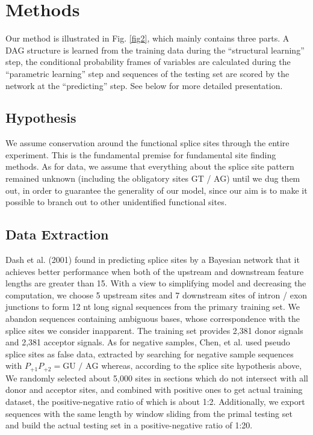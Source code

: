 \documentclass[journal,twoside]{IEEEtran}
\begin{document}
\section{Methods}\label{2}

Our method is illustrated in Fig. \ref{fig2}, which mainly contains three parts. A DAG structure is learned from the training data during the ``structural learning'' step, the conditional probability frames of variables are calculated during the ``parametric learning'' step and sequences of the testing set are scored by the network at the ``predicting'' step. See below for more detailed presentation. 

\subsection{Hypothesis}\label{2.1}

We assume conservation around the functional splice sites through the entire experiment. This is the fundamental premise for fundamental site finding methods. As for data, we assume that everything about the splice site pattern remained unknown (including the obligatory sites GT / AG) until we dug them out, in order to guarantee the generality of our model, since our aim is to make it possible to branch out to other unidentified functional sites. 

\subsection{Data Extraction}\label{2.2}

Dash et al. (2001) \cite{dash2001modeling} found in predicting splice sites by a Bayesian network that it achieves better performance when both of the upstream and downstream feature lengths are greater than 15. With a view to simplifying model and decreasing the computation, we choose 5 upstream sites and 7 downstream sites of intron / exon junctions to form 12 nt long signal sequences from the primary training set. We abandon sequences containing ambiguous bases, whose correspondence with the splice sites we consider inapparent. The training set provides 2,381 donor signals and 2,381 acceptor signals. As for negative samples, Chen, et al. \cite{chen2005prediction} used pseudo splice sites as false data, extracted by searching for negative sample sequences with $P_{+1}P_{+2} = \text{GU / AG}$ whereas, according to the splice site hypothesis above, We randomly selected about 5,000 sites in sections which do not intersect with all donor and acceptor sites, and combined with positive ones to get actual training dataset, the positive-negative ratio of which is about 1:2. Additionally, we export sequences with the same length by window sliding from the primal testing set and build the actual testing set in a positive-negative ratio of 1:20. 
\end{document}
